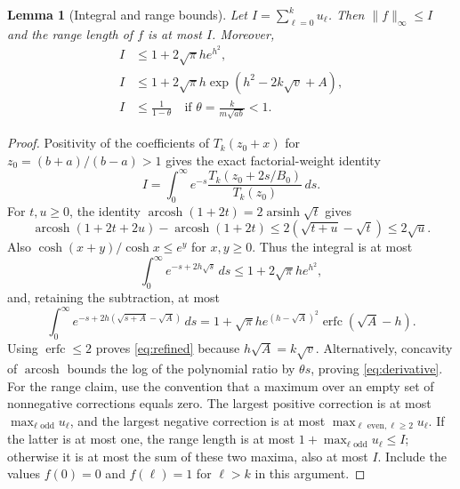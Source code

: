 \documentclass[10pt]{article}
\newtheorem{lemma}{Lemma}
\DeclareMathOperator{\arcosh}{arcosh}
\DeclareMathOperator{\arsinh}{arsinh}
\begin{document}
\begin{lemma}[Integral and range bounds]\label{lem:integral}
Let $I=\sum_{\ell=0}^k u_\ell$. Then $\|f\|_\infty\le I$ and the
range length of $f$ is at most $I$. Moreover,
\begin{align}
 I&\le1+2\sqrt\pi h e^{h^2},\label{eq:coarse}\\
 I&\le1+2\sqrt\pi h\exp(h^2-2k\sqrt v+A),\label{eq:refined}\\
 I&\le\frac1{1-\theta}\quad\text{if }\theta=\frac{k}{m\sqrt{ab}}<1.
 \label{eq:derivative}
\end{align}
\end{lemma}
\begin{proof}
Positivity of the coefficients of $T_k(z_0+x)$ for $z_0=(b+a)/(b-a)>1$
gives the exact factorial-weight identity
\[
 I=\int_0^\infty e^{-s}\frac{T_k(z_0+2s/B_0)}{T_k(z_0)}\,ds.
\]
For $t,u\ge0$, the identity $\arcosh(1+2t)=2\arsinh\sqrt t$ gives
\[
 \arcosh(1+2t+2u)-\arcosh(1+2t)
 \le2(\sqrt{t+u}-\sqrt t)\le2\sqrt u.
\]
Also $\cosh(x+y)/\cosh x\le e^y$ for $x,y\ge0$.
Thus the integral is at most
\[
 \int_0^\infty e^{-s+2h\sqrt s}\,ds
 \le1+2\sqrt\pi h e^{h^2},
\]
and, retaining the subtraction, at most
\[
 \int_0^\infty e^{-s+2h(\sqrt{s+A}-\sqrt A)}\,ds
 =1+\sqrt\pi h e^{(h-\sqrt A)^2}\operatorname{erfc}(\sqrt A-h).
\]
Using $\operatorname{erfc}\le2$ proves \eqref{eq:refined} because
$h\sqrt A=k\sqrt v$.
Alternatively, concavity of $\arcosh$ bounds the log of the polynomial
ratio by $\theta s$, proving \eqref{eq:derivative}.
For the range claim, use the convention that a maximum over an empty
set of nonnegative corrections equals zero. The largest positive correction is at most
$\max_{\ell\text{ odd}}u_\ell$, and the largest negative correction
is at most $\max_{\ell\text{ even},\ell\ge2}u_\ell$.
If the latter is at most one, the range length is at most
$1+\max_{\ell\text{ odd}}u_\ell\le I$; otherwise it is at most the sum
of these two maxima, also at most $I$. Include the values $f(0)=0$ and
$f(\ell)=1$ for $\ell>k$ in this argument.
\end{proof}
\end{document}
